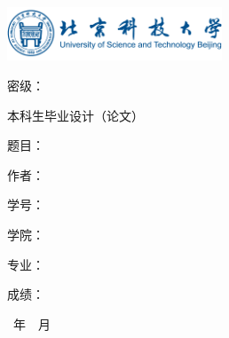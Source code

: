 \begin{titlepage}
  \noindent\includegraphics[width=0.48\textwidth]{imgs/logo.png}

  \begin{flushright}
    {\songti{}密级：\uline{}}
  \end{flushright}

  \vspace{3cm}

  {\noindent\heiti{}本科生毕业设计（论文）}

  \vspace{4.5cm}


  {\heiti 题\hspace{0.5em}目：}\uline{\makebox[7.5cm][c]{\ctitlefirst}}

  \vspace{0.4cm}

  {\heiti \hspace{3.5em}}\uline{\makebox[7.5cm][c]{\ctitlesecond}}

  \vspace{0.4cm}

  {\heiti 作\hspace{0.5em}者：}\uline{\makebox[7.5cm][c]{\name}}

  \vspace{0.4cm}

  {\heiti 学\hspace{0.5em}号：}\uline{\makebox[7.5cm][c]{\id}}

  \vspace{0.4cm}

  {\heiti 学\hspace{0.5em}院：}\uline{\makebox[7.5cm][c]{\collage}}

  \vspace{0.4cm}

  {\heiti 专\hspace{0.5em}业：}\uline{\makebox[7.5cm][c]{\major}}

  \vspace{0.4cm}

  {\heiti 成\hspace{0.5em}绩：}\uline{\makebox[7.5cm][c]{}}

  \vspace{0.7cm}

  \begin{center}
    {\songti{}\year\ 年\ \month\ 月}
  \end{center}

\end{titlepage} 